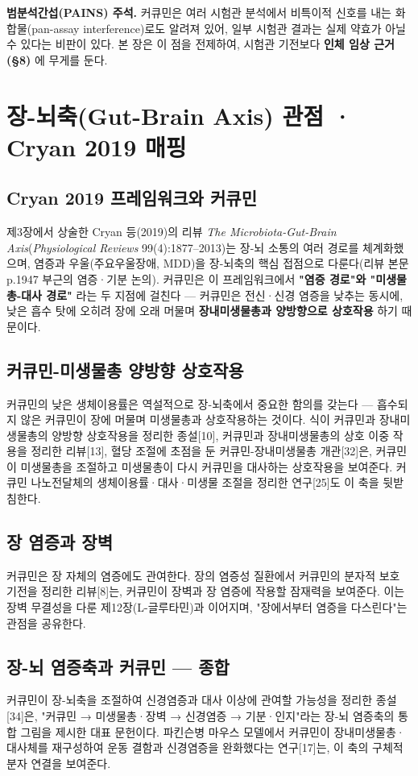 \documentclass[11pt,oneside]{book}
\newenvironment{authnote}
  {\par\smallskip\begingroup\leftskip=7mm\rightskip=5mm\small\color{muted}\noindent\ignorespaces}
  {\par\endgroup\smallskip}
\begin{document}
\begin{authnote}\textbf{범분석간섭(PAINS) 주석.} 커큐민은 여러 시험관 분석에서 비특이적 신호를 내는 화합물(pan-assay interference)로도 알려져 있어, 일부 시험관 결과는 실제 약효가 아닐 수 있다는 비판이 있다. 본 장은 이 점을 전제하여, 시험관 기전보다 \textbf{인체 임상 근거(§8)} 에 무게를 둔다.\end{authnote}
\section{장-뇌축(Gut-Brain Axis) 관점 · Cryan 2019 매핑}
\subsection{Cryan 2019 프레임워크와 커큐민}
제3장에서 상술한 Cryan 등(2019)의 리뷰 \textit{The Microbiota-Gut-Brain Axis}(\textit{Physiological Reviews} 99(4):1877–2013)는 장-뇌 소통의 여러 경로를 체계화했으며, 염증과 우울(주요우울장애, MDD)을 장-뇌축의 핵심 접점으로 다룬다(리뷰 본문 p.1947 부근의 염증·기분 논의). 커큐민은 이 프레임워크에서 \textbf{"염증 경로"와 "미생물총-대사 경로"} 라는 두 지점에 걸친다 — 커큐민은 전신·신경 염증을 낮추는 동시에, 낮은 흡수 탓에 오히려 장에 오래 머물며 \textbf{장내미생물총과 양방향으로 상호작용} 하기 때문이다.

\subsection{커큐민-미생물총 양방향 상호작용}
커큐민의 낮은 생체이용률은 역설적으로 장-뇌축에서 중요한 함의를 갖는다 — 흡수되지 않은 커큐민이 장에 머물며 미생물총과 상호작용하는 것이다. 식이 커큐민과 장내미생물총의 양방향 상호작용을 정리한 종설[10], 커큐민과 장내미생물총의 상호 이중 작용을 정리한 리뷰[13], 혈당 조절에 초점을 둔 커큐민-장내미생물총 개관[32]은, 커큐민이 미생물총을 조절하고 미생물총이 다시 커큐민을 대사하는 상호작용을 보여준다. 커큐민 나노전달체의 생체이용률·대사·미생물 조절을 정리한 연구[25]도 이 축을 뒷받침한다.

\subsection{장 염증과 장벽}
커큐민은 장 자체의 염증에도 관여한다. 장의 염증성 질환에서 커큐민의 분자적 보호 기전을 정리한 리뷰[8]는, 커큐민이 장벽과 장 염증에 작용할 잠재력을 보여준다. 이는 장벽 무결성을 다룬 제12장(L-글루타민)과 이어지며, "장에서부터 염증을 다스린다"는 관점을 공유한다.

\subsection{장-뇌 염증축과 커큐민 — 종합}
커큐민이 장-뇌축을 조절하여 신경염증과 대사 이상에 관여할 가능성을 정리한 종설[34]은, "커큐민 → 미생물총·장벽 → 신경염증 → 기분·인지"라는 장-뇌 염증축의 통합 그림을 제시한 대표 문헌이다. 파킨슨병 마우스 모델에서 커큐민이 장내미생물총·대사체를 재구성하여 운동 결함과 신경염증을 완화했다는 연구[17]는, 이 축의 구체적 분자 연결을 보여준다.
\end{document}

